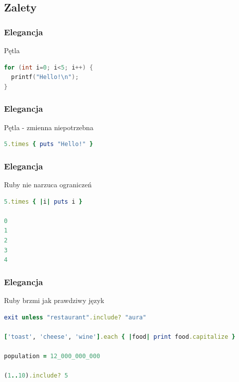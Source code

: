 
\subsection{Zalety}


\begin{frame}[fragile]
\frametitle{Elegancja}
\begin{block}{Pętla}
\begin{lstlisting}[language=C++]
for (int i=0; i<5; i++) {
  printf("Hello!\n");
}
\end{lstlisting}
\end{block}
\end{frame}


\begin{frame}[fragile]
\frametitle{Elegancja}
\begin{block}{Pętla - zmienna niepotrzebna}
\begin{lstlisting}[language=Ruby]
5.times { puts "Hello!" }
\end{lstlisting}
\end{block}
\end{frame}
\begin{frame}[fragile]
\frametitle{Elegancja}
\begin{block}{Ruby nie narzuca ograniczeń}
\begin{lstlisting}[language=Ruby]
5.times { |i| puts i }

0
1
2
3
4
\end{lstlisting}
\end{block}
\end{frame}
\begin{frame}[fragile]
\frametitle{Elegancja}
\begin{block}{Ruby brzmi jak prawdziwy język}
\begin{lstlisting}[language=Ruby,basicstyle=\tiny\ttfamily]
exit unless "restaurant".include? "aura"

['toast', 'cheese', 'wine'].each { |food| print food.capitalize }

population = 12_000_000_000

(1..10).include? 5
\end{lstlisting}
\end{block}
\end{frame}

